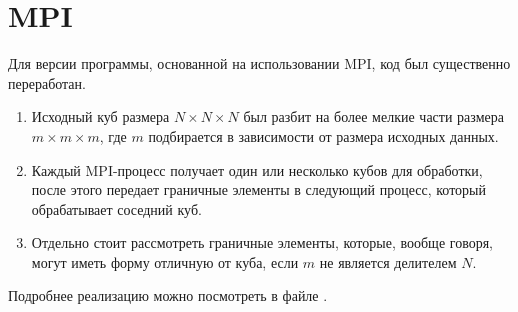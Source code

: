 \section{MPI}

Для версии программы, основанной на использовании MPI, код был существенно переработан. 

\begin{enumerate}
    \item Исходный куб размера $N \times N \times N$ был разбит на более мелкие части размера $m \times m \times m$, где $m$ подбирается в зависимости от размера исходных данных.
    \item Каждый MPI-процесс получает один или несколько кубов для обработки, после этого передает граничные элементы в следующий процесс, который обрабатывает соседний куб.
    \item Отдельно стоит рассмотреть граничные элементы, которые, вообще говоря, могут иметь форму отличную от куба, если $m$ не является делителем $N$.
\end{enumerate}

Подробнее реализацию можно посмотреть в файле .

